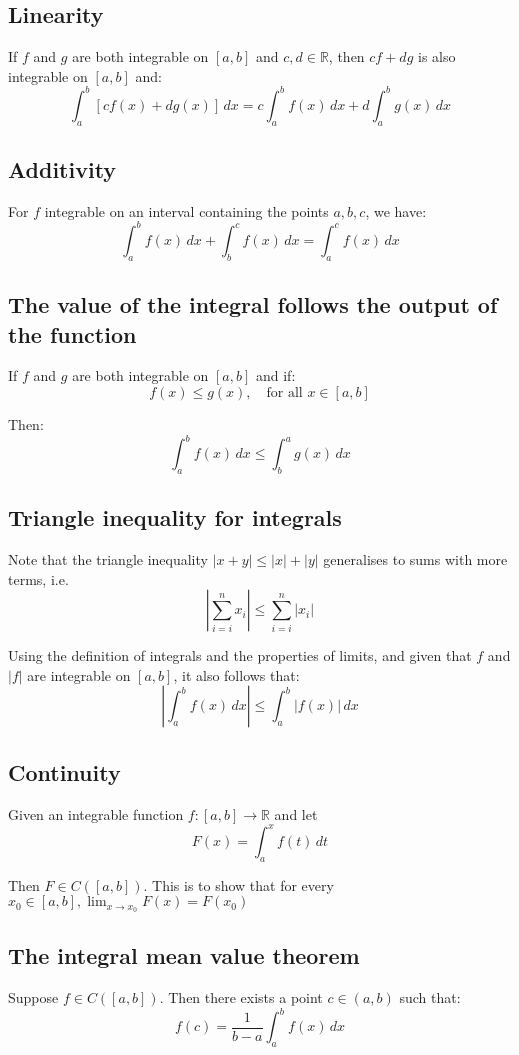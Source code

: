 \documentclass[11pt]{article}
\begin{document}
\subsection{Linearity}
\label{sec:orga9914fb}
If \(f\) and \(g\) are both integrable on \([a, b]\) and \(c, d \in \mathbb{R}\), then \(cf + dg\) is also integrable on \([a, b]\) and:
\[\int_a^b [cf(x) + dg(x)] \, dx = c \int_a^b f(x) \, dx + d \int_a^b g(x) \, dx\]
\subsection{Additivity}
\label{sec:orgc207685}
For \(f\) integrable on an interval containing the points \(a, b, c\), we have:
\[\int_a^b f(x) \, dx + \int_b^c f(x) \, dx = \int_a^c f(x) \, dx\]
\subsection{The value of the integral follows the output of the function}
\label{sec:org93e8b37}
If \(f\) and \(g\) are both integrable on \([a, b]\) and if:
\[f(x) \le g(x), \quad \text{for all } x \in [a, b]\]

Then:
\[\int_a^b f(x) \, dx \le \int_b^a g(x) \, dx\]
\subsection{Triangle inequality for integrals}
\label{sec:orgb36d272}
Note that the triangle inequality \(|x + y| \le |x| + |y|\) generalises to sums with more terms, i.e.
\[\left| \sum_{i = i}^n x_i \right| \le \sum_{i = i}^n |x_i|\]

Using the definition of integrals and the properties of limits, and given that \(f\) and \(|f|\) are integrable on \([a, b]\), it also follows that:
\[\left| \int_a^b f(x) \, dx \right| \le \int_a^b |f(x)| \, dx\]
\subsection{Continuity}
\label{sec:org6ac3cfb}
Given an integrable function \(f : [a, b] \rightarrow \mathbb{R}\) and let
\[F(x) = \int_a^x f(t) \, dt\]

Then \(F \in C([a, b])\). This is to show that for every \(x_0 \in [a, b], \lim_{x \rightarrow x_0} F(x) = F(x_0)\)
\subsection{The integral mean value theorem}
\label{sec:orga1739c0}
Suppose \(f \in C([a, b])\). Then there exists a point \(c \in (a, b)\) such that:
\[f(c) = \frac{1}{b - a} \int_a^b f(x) \, dx\]
\end{document}
